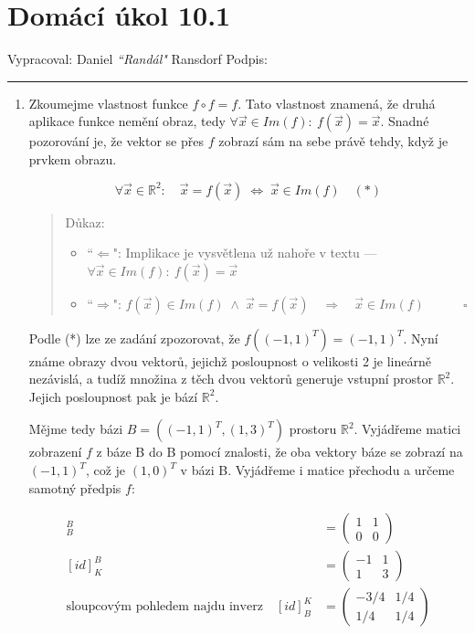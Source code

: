 \documentclass[12pt]{article}
\begin{document}
\section*{Domácí úkol 10.1}

Vypracoval: Daniel \textit{``Randál"} Ransdorf \hfill Podpis: \rule{4cm}{0.4pt}

\begin{enumerate}
  
  \item Zkoumejme vlastnost funkce $f\circ f=f$. Tato vlastnost znamená,
  že druhá aplikace funkce nemění obraz, tedy $\forall \vec{x} \in Im(f):\ f(\vec{x}) = \vec{x}$.
  Snadné pozorování je, že vektor se přes $f$ zobrazí sám na sebe právě tehdy, když je prvkem obrazu.

  \[
    \forall \vec{x} \in \mathbb{R}^2 : \quad \vec{x}=f(\vec{x}) \;\Longleftrightarrow\; \vec{x} \in Im(f) \quad (*)
  \]

  \begin{quote}
    \small
    Důkaz: 
    \begin{itemize}
      \item ``$\Leftarrow$": Implikace je vysvětlena už nahoře v textu --- $\forall \vec{x} \in Im(f):\ f(\vec{x}) = \vec{x}$
      \item ``$\Rightarrow$": $f(\vec{x}) \in Im(f) \;\land\; \vec{x}=f(\vec{x}) \quad \Longrightarrow \quad \vec{x} \in Im(f) \quad\quad\quad \square$
    \end{itemize} 
  \end{quote}


  Podle (*) lze ze zadání zpozorovat, že $f\left( (-1,1)^T \right) = (-1,1)^T$.
  Nyní známe obrazy dvou vektorů, jejichž posloupnost o velikosti 2 je lineárně nezávislá,
  a tudíž množina z těch dvou vektorů generuje vstupní prostor $\mathbb{R}^2$. Jejich posloupnost pak je bází $\mathbb{R}^2$.

  Mějme tedy bázi $B = \left((-1,1)^T, (1,3)^T \right)$ prostoru $\mathbb{R}^2$. Vyjádřeme matici zobrazení $f$ z báze B do B
  pomocí znalosti, že oba vektory báze se zobrazí na $(-1,1)^T$, což je $(1,0)^T$ v bázi B.
  Vyjádřeme i matice přechodu a určeme samotný předpis $f$:

  \begin{align*}
    [f]^B_B &= \left(\begin{array}{cc}
        1 & 1 \\
        0 & 0
      \end{array}\right) \\
    [id]^B_K &= \left(\begin{array}{cc}
        -1 & 1 \\
        1 & 3
      \end{array}\right) \\
    \text{sloupcovým pohledem najdu inverz} \quad [id]^K_B &= \left(\begin{array}{cc}
        -3/4 & 1/4 \\
        1/4 & 1/4
      \end{array}\right) \\
  \end{align*}


\end{enumerate}
\end{document}
